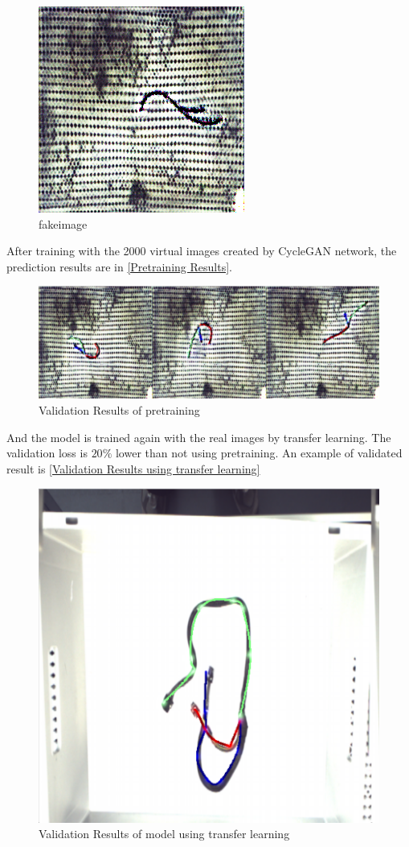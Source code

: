 \begin{figure}
	\centering
	\includegraphics[width=0.6\linewidth]{example_images/CycleGAN_fakeimage}
	\caption{fakeimage}
	\label{fig:fakeimage}
\end{figure}
After training with the 2000 virtual images created by CycleGAN network, the prediction results are in \autoref{Pretraining Results}.
\begin{figure}
	\centering
	\includegraphics[width=0.6\linewidth]{example_images/PretrainingResultCycleGAN}
	\caption{Validation Results of pretraining}
	\label{Pretraining Results}
\end{figure}
And the model is trained again with the real images by transfer learning. The validation loss is $20\%$ lower than not using pretraining. An example of validated result is 
\autoref{Validation Results using transfer learning}
\begin{figure}
	\centering
	\includegraphics[width=0.6\linewidth]{example_images/usePretraining_NoTransformer}
	\caption{Validation Results of model using transfer learning}
	\label{Validation Results using transfer learning}
\end{figure}



